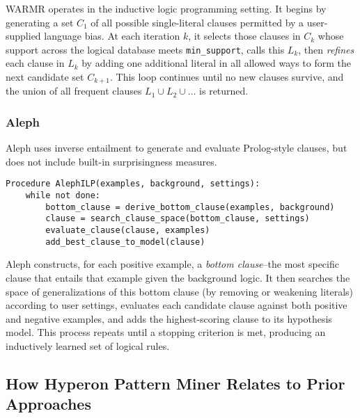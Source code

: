 \documentclass{article}
\begin{document}
WARMR operates in the inductive logic programming setting.  It begins by generating a set \(C_1\) of all possible single-literal clauses permitted by a user-supplied language bias.  At each iteration \(k\), it selects those clauses in \(C_k\) whose support across the logical database meets \texttt{min\_support}, calls this \(L_k\), then \emph{refines} each clause in \(L_k\) by adding one additional literal in all allowed ways to form the next candidate set \(C_{k+1}\).  This loop continues until no new clauses survive, and the union of all frequent clauses \(L_1 \cup L_2 \cup \dots\) is returned.

\subsubsection{Aleph}

Aleph \cite{srinivasan2002aleph} uses inverse entailment to generate and evaluate Prolog-style clauses, but does not include built-in surprisingness measures.

\begin{verbatim}
Procedure AlephILP(examples, background, settings):
    while not done:
        bottom_clause = derive_bottom_clause(examples, background)
        clause = search_clause_space(bottom_clause, settings)
        evaluate_clause(clause, examples)
        add_best_clause_to_model(clause)
\end{verbatim}

Aleph constructs, for each positive example, a \emph{bottom clause}--the most specific clause that entails that example given the background logic.  It then searches the space of generalizations of this bottom clause (by removing or weakening literals) according to user settings, evaluates each candidate clause against both positive and negative examples, and adds the highest-scoring clause to its hypothesis model.  This process repeats until a stopping criterion is met, producing an inductively learned set of logical rules.

\subsection{How Hyperon Pattern Miner Relates to Prior Approaches}
\end{document}
